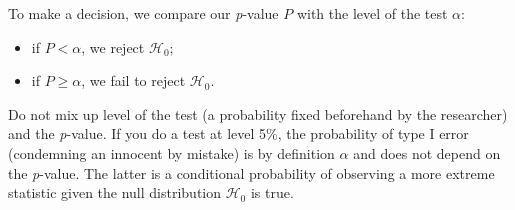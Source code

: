 \documentclass[
  11pt,
  letterpaper,
]{scrbook}
\providecommand{\tightlist}{%
  \setlength{\itemsep}{0pt}\setlength{\parskip}{0pt}}\usepackage{longtable,booktabs,array}
\theoremstyle{definition}
\theoremstyle{definition}
\theoremstyle{remark}
\begin{document}
To make a decision, we compare our \emph{p}-value \(P\) with the level
of the test \(\alpha\):

\begin{itemize}
\tightlist
\item
  if \(P < \alpha\), we reject \(\mathscr{H}_0\);
\item
  if \(P \geq \alpha\), we fail to reject \(\mathscr{H}_0\).
\end{itemize}

Do not mix up level of the test (a probability fixed beforehand by the
researcher) and the \emph{p}-value. If you do a test at level 5\%, the
probability of type I error (condemning an innocent by mistake) is by
definition \(\alpha\) and does not depend on the \emph{p}-value. The
latter is a conditional probability of observing a more extreme
statistic given the null distribution \(\mathscr{H}_0\) is true.
\end{document}
